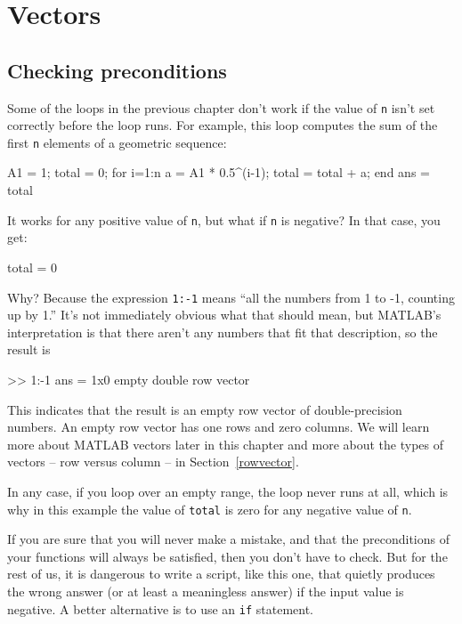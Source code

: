 \documentclass[
]{book}
\numberwithin{Answer}{chapter}
\numberwithin{Exercise}{chapter}
\begin{document}
\chapter{Vectors}
\label{chpt:vectors}

\section{Checking preconditions}

Some of the loops in the previous chapter don't work
if the value of {\tt n} isn't set correctly before the loop runs.
For example, this loop computes the sum of the first {\tt n} elements
of a geometric sequence:

\begin{code}
A1 = 1;
total = 0;
for i=1:n
    a = A1 * 0.5^(i-1);
    total = total + a;
end
ans = total
\end{code}

It works for any positive value of {\tt n}, but what if {\tt n}
is negative?  In that case, you get:

\begin{code}
total = 0
\end{code}

Why?  Because the expression {\tt 1:-1} means ``all the numbers
from 1 to -1, counting up by 1.''  
It's not immediately obvious
what that should mean, but MATLAB's interpretation is that there
aren't any numbers that fit that description, so the result is

\begin{code}
>> 1:-1
ans = 1x0 empty double row vector
\end{code}

This indicates that the result is an empty row vector of 
double-precision numbers.  An empty row vector has one rows and zero columns.  We will learn more about MATLAB vectors later in this
chapter and more about the types of vectors -- row versus column --
in Section~\ref{rowvector}.

In any case, if you loop over an empty range,
the loop never runs at all, which is why in this example the
value of {\tt total} is zero for any negative value of {\tt n}.

If you are sure that you will never make a mistake, and that the
preconditions of your functions will always be satisfied, then you
don't have to check.  But for the rest of us, it is dangerous to write
a script, like this one, that quietly produces the wrong answer (or
at least a meaningless answer) if the input value is negative.
A better alternative is to use an {\tt if} statement.
\end{document}
